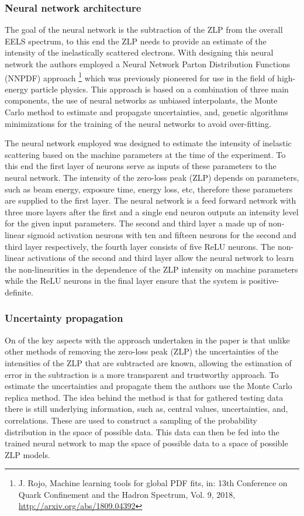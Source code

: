 \documentclass[a4paper]{scrartcl}
\begin{document}
\subsubsection*{Neural network architecture}
The goal of the neural network is the subtraction of the ZLP from the overall EELS spectrum, to this end the ZLP needs to provide an estimate of the intensity of the inelastically scattered electrons. With designing this neural network the authors employed a Neural Network Parton Distribution Functions (NNPDF) approach \footnote{ J. Rojo, Machine learning tools for global PDF fits, in: 13th Conference on Quark Confinement and the Hadron Spectrum, Vol. 9, 2018, \href{http://arxiv.org/abs/1809.04392}{http://arxiv.org/abs/1809.04392}} which was previously pioneered for use in the field of high-energy particle physics. This approach is based on a combination of three main components, the use of neural networks as unbiased interpolants, the Monte Carlo method to estimate and propagate uncertainties, and, genetic algorithms minimizations for the training of the neural networks to avoid over-fitting.

The neural network employed was designed to estimate the intensity of inelastic scattering based on the machine parameters at the time of the experiment. To this end the first layer of neurons serve as inputs of these parameters to the neural network. The intensity of the zero-loss peak (ZLP) depends on parameters, such as beam energy, exposure time, energy loss, etc, therefore these parameters are supplied to the first layer. The neural network is a feed forward network with three more layers after the first and a single end neuron outputs an intensity level for the given input parameters. The second and third layer a made up of non-linear sigmoid activation neurons with ten and fifteen neurons for the second and third layer respectively, the fourth layer consists of five ReLU neurons. The non-linear activations of the second and third layer allow the neural network to learn the non-linearities in the dependence of the ZLP intensity on machine parameters while the ReLU neurons in the final layer ensure that the system is positive-definite.

\subsubsection*{Uncertainty propagation}
On of the key aspects with the approach undertaken in the paper is that unlike other methods of removing the zero-loss peak (ZLP) the uncertainties of the intensities of the ZLP that are subtracted are known, allowing the estimation of error in the subtraction is a more transparent and trustworthy approach.
To estimate the uncertainties and propagate them the authors use the Monte Carlo replica method. The idea behind the method is that for gathered testing data there is still underlying information, such as, central values, uncertainties, and, correlations. These are used to construct a sampling of the probability distribution in the space of possible data. This data can then be fed into the trained neural network to map the space of possible data to a space of possible ZLP models.
\end{document}
